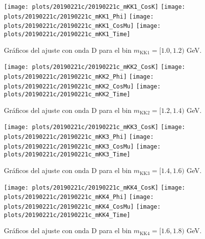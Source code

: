 \newpage

\begin{figure}[H]
\centering
\begin{multicols}{2}
\texttt{[image: plots/20190221c/20190221c\_mKK1\_CosK]}
\texttt{[image: plots/20190221c/20190221c\_mKK1\_Phi]}
\texttt{[image: plots/20190221c/20190221c\_mKK1\_CosMu]}
\texttt{[image: plots/20190221c/20190221c\_mKK1\_Time]}
\end{multicols}
\vspace*{-0.5cm}
\caption{Gráficos del ajuste con onda D para el bin $m_{\text{KK}1} = [1.0,1.2)$ GeV.}  \label{fig:20190221c_mKK1}
\end{figure}

\begin{figure}[H]
\centering
\begin{multicols}{2}
\texttt{[image: plots/20190221c/20190221c\_mKK2\_CosK]}
\texttt{[image: plots/20190221c/20190221c\_mKK2\_Phi]}
\texttt{[image: plots/20190221c/20190221c\_mKK2\_CosMu]}
\texttt{[image: plots/20190221c/20190221c\_mKK2\_Time]}
\end{multicols}
\vspace*{-0.5cm}
\caption{Gráficos del ajuste con onda D para el bin $m_{\text{KK}2} = [1.2,1.4)$ GeV.}  
\end{figure}

\begin{figure}[H]
\centering
\begin{multicols}{2}
\texttt{[image: plots/20190221c/20190221c\_mKK3\_CosK]}
\texttt{[image: plots/20190221c/20190221c\_mKK3\_Phi]}
\texttt{[image: plots/20190221c/20190221c\_mKK3\_CosMu]}
\texttt{[image: plots/20190221c/20190221c\_mKK3\_Time]}
\end{multicols}
\vspace*{-0.5cm}
\caption{Gráficos del ajuste con onda D para el bin $m_{\text{KK}3} = [1.4,1.6)$ GeV.}  
\end{figure}

\begin{figure}[H]
\centering
\begin{multicols}{2}
\texttt{[image: plots/20190221c/20190221c\_mKK4\_CosK]}
\texttt{[image: plots/20190221c/20190221c\_mKK4\_Phi]}
\texttt{[image: plots/20190221c/20190221c\_mKK4\_CosMu]}
\texttt{[image: plots/20190221c/20190221c\_mKK4\_Time]}
\end{multicols}
\vspace*{-0.5cm}
\caption{Gráficos del ajuste con onda D para el bin $m_{\text{KK}4} = [1.6,1.8)$ GeV.}  
\end{figure}

